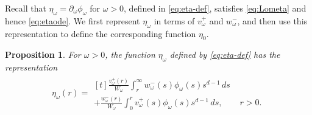 \documentclass[12pt, a4paper, reqno]{amsart}
\numberwithin{equation}{section}
\newtheorem{proposition}[theorem]{Proposition}
\theoremstyle{definition}
\theoremstyle{remark}
\newcommand{\pt}{\partial}
\begin{document}
Recall that $\eta_\omega=\pt_\omega\phi_\omega$ for $\omega>0$,
defined in \eqref{eq:eta-def}, satisfies \eqref{eq:Lometa} and hence
\eqref{eq:etaode}. We first represent $\eta_\omega$ in terms of
$v_\omega^+$ and $w_\omega^-$, and then use this representation to
define the corresponding function $\eta_0$.
\begin{proposition}\label{prop:eta}
For $\omega>0$, the function $\eta_\omega$ defined by
\eqref{eq:eta-def} has the representation
\begin{align} \label{eq:etaom}
    \eta_\omega(r)
    =\begin{multlined}[t]
    \frac{v_\omega^+(r)}{W_\omega}
    \int_r^\infty w_\omega^-(s)\phi_\omega(s)s^{d-1}\,ds
\\  +\frac{w_\omega^-(r)}{W_\omega}
    \int_0^r v_\omega^+(s)\phi_\omega(s)s^{d-1}\,ds,
    \qquad r>0.
    \end{multlined}
\end{align}
\end{proposition}
\end{document}
